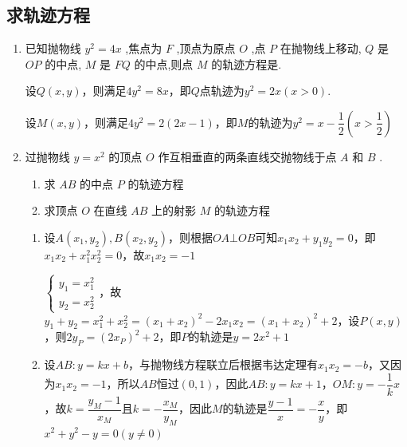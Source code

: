 \subsection*{求轨迹方程}
\begin{enumerate}
    \item 已知抛物线 ${y}^{2} = {4x}$ ,焦点为 $F$ ,顶点为原点 $O$ ,点 $P$ 在抛物线上移动, $Q$ 是 ${OP}$ 的中点, $M$ 是 ${FQ}$ 的中点,则点 $M$ 的轨迹方程是.
    \begin{jieda}
        设$Q(x, y)$，则满足$4{y}^{2} = 8x$，即$Q$点轨迹为$y^2 = 2x(x > 0)$.

        设$M(x, y)$，则满足$4y^2 = 2(2x-1)$，即$M$的轨迹为$y^2 = x-\dfrac{1}{2} \left(x > \dfrac{1}{2}\right)$
    \end{jieda}
    \item 过抛物线 $y = {x}^{2}$ 的顶点 $O$ 作互相垂直的两条直线交抛物线于点 $A$ 和 $B$ .
    \begin{enumerate}
        \item 求 ${AB}$ 的中点 $P$ 的轨迹方程
        \item 求顶点 $O$ 在直线 ${AB}$ 上的射影 $M$ 的轨迹方程
    \end{enumerate}
    \begin{jieda}
        \begin{enumerate}
            \item 设$A(x_1, y_2), B(x_2, y_2)$，则根据$OA \bot OB$可知$x_1x_2+y_1y_2 = 0$，即$x_1x_2+x_1^2x_2^2 = 0$，故$x_1x_2 = -1$

            $\left\{\begin{array}{l}
                 y_1 = x_1^2 \\
                 y_2 = x_2^2
            \end{array}\right.$，故$y_1+y_2 = x_1^2+x_2^2 = (x_1+x_2)^2-2x_1x_2 = (x_1+x_2)^2+2$，设$P(x, y)$，则$2y_P = (2x_P)^2+2$，即$P$的轨迹是$y = 2x^2+1$
            \item 设$AB: y = kx+b$，与抛物线方程联立后根据韦达定理有$x_1x_2 = -b$，又因为$x_1x_2 = -1$，所以$AB$恒过$(0, 1)$，因此$AB: y = kx+1$，$OM: y = -\dfrac{1}{k}x$，故$k = \dfrac{y_M - 1}{x_M}$且$k = -\dfrac{x_M}{y_M}$，因此$M$的轨迹是$\dfrac{y - 1}{x} = -\dfrac{x}{y}$，即$x^2+y^2-y = 0(y \neq 0)$
        \end{enumerate}
    \end{jieda}
\end{enumerate}
